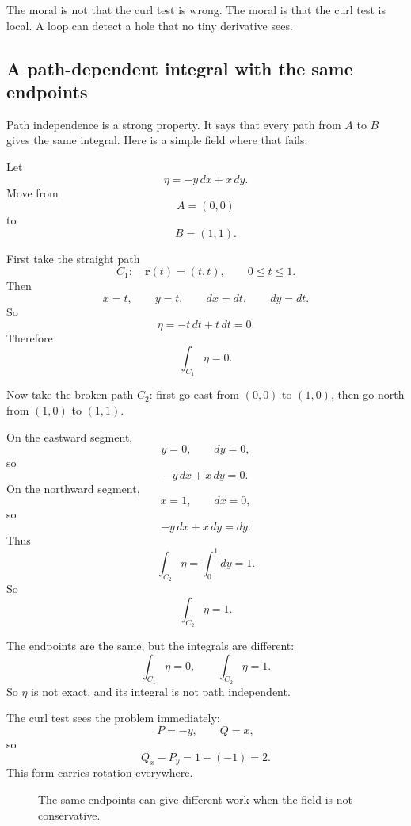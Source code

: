 The moral is not that the curl test is wrong.  The moral is that the curl test is local.
A loop can detect a hole that no tiny derivative sees.

\subsection{A path-dependent integral with the same endpoints}

Path independence is a strong property.  It says that every path from \(A\) to \(B\)
gives the same integral.  Here is a simple field where that fails.

Let
\[
    \eta=-y\,dx+x\,dy.
\]
Move from
\[
    A=(0,0)
\]
to
\[
    B=(1,1).
\]

First take the straight path
\[
    C_1:\quad \mathbf r(t)=(t,t),
    \qquad 0\le t\le1.
\]
Then
\[
    x=t,\qquad y=t,\qquad dx=dt,\qquad dy=dt.
\]
So
\[
    \eta=-t\,dt+t\,dt=0.
\]
Therefore
\[
\boxed{
    \int_{C_1}\eta=0.
}
\]

Now take the broken path \(C_2\): first go east from \((0,0)\) to \((1,0)\), then go
north from \((1,0)\) to \((1,1)\).

On the eastward segment,
\[
    y=0,\qquad dy=0,
\]
so
\[
    -y\,dx+x\,dy=0.
\]
On the northward segment,
\[
    x=1,\qquad dx=0,
\]
so
\[
    -y\,dx+x\,dy=dy.
\]
Thus
\[
    \int_{C_2}\eta
    =
    \int_0^1 dy
    =
    1.
\]
So
\[
\boxed{
    \int_{C_2}\eta=1.
}
\]

The endpoints are the same, but the integrals are different:
\[
    \int_{C_1}\eta=0,
    \qquad
    \int_{C_2}\eta=1.
\]
So \(\eta\) is not exact, and its integral is not path independent.

The curl test sees the problem immediately:
\[
    P=-y,\qquad Q=x,
\]
so
\[
    Q_x-P_y=1-(-1)=2.
\]
This form carries rotation everywhere.

\begin{figure}[h]
\centering
{}
\caption{The same endpoints can give different work when the field is not conservative.}
\end{figure}

